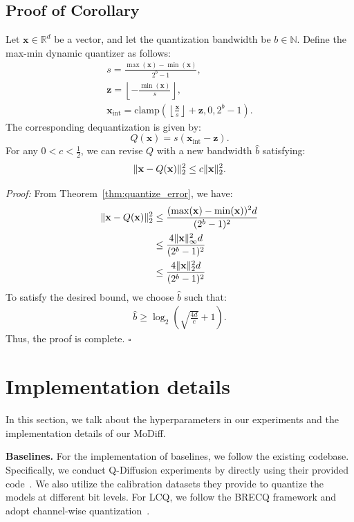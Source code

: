 \subsection{Proof of Corollary}
\label{subsec:corollary}
\begin{corollary}
Let \( \mathbf{x} \in \mathbb{R}^d \) be a vector, and let the quantization bandwidth be \( b \in \mathbb{N} \). Define the max-min dynamic quantizer as follows:
\begin{gather}
    s  = \frac{\max(\mathbf{x}) - \min(\mathbf{x})}{2^b - 1}, \\
    \mathbf{z}  = \left\lfloor -\frac{\min(\mathbf{x})}{s} \right\rfloor, \\
    \mathbf{x}_\text{int}  = \text{clamp}(\left\lfloor \frac{\mathbf{x}}{s} \right\rfloor + \mathbf{z}, 0, 2^b-1).
\end{gather}
The corresponding dequantization is given by:
\begin{equation}
    Q(\mathbf{x}) = s (\mathbf{x}_\text{int} - \mathbf{z}).
\end{equation}
For any $0<c<\frac{1}{2}$, we can revise $Q$ with a new bandwidth $\hat b$ satisfying:
\begin{align}
    \|{\mathbf{x}}- Q({\mathbf{x}})\|_2^2\leq c\|{\mathbf{x}}\|_2^2.
\end{align}
\end{corollary}

\textit{Proof:} From Theorem~\ref{thm:quantize_error}, we have:
\begin{align}
    \|\mathbf{x} - Q(\mathbf{x})\|_2^2 &\leq \frac{(\max(\mathbf{x}) - \min(\mathbf{x}))^2d}{(2^b - 1)^2} \\
    & \leq \frac{4\|{\mathbf{x}}\|_\infty^2d}{(2^b - 1)^2} \\
    & \leq \frac{4\|{\mathbf{x}}\|_2^2d}{(2^b - 1)^2}
\end{align}
To satisfy the desired bound, we choose $\hat{b}$ such that: \begin{align} \hat{b} \geq \log_2\left(\sqrt{\frac{4d}{c}} + 1\right). \end{align} Thus, the proof is complete. \hfill$\square$

\section{Implementation details}
\label{appsec:implement}
In this section, we talk about the hyperparameters in our experiments and the implementation details of our MoDiff. 

\textbf{Baselines.}
For the implementation of baselines, we follow the existing codebase. Specifically, we conduct Q-Diffusion experiments by directly using their provided code~\citep{li2023q}. We also utilize the calibration datasets they provide to quantize the models at different bit levels. For LCQ, we follow the BRECQ framework and adopt channel-wise quantization~\citep{li2021brecq}.

